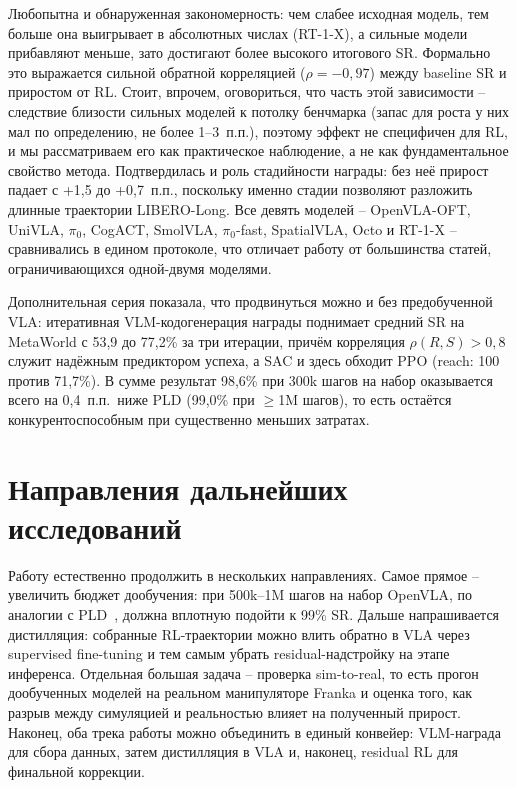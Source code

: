     Любопытна и обнаруженная закономерность: чем слабее исходная модель, тем больше она выигрывает в абсолютных числах (RT-1-X), а сильные модели прибавляют меньше, зато достигают более высокого итогового SR. Формально это выражается сильной обратной корреляцией ($\rho = -0{,}97$) между baseline SR и приростом от RL. Стоит, впрочем, оговориться, что часть этой зависимости -- следствие близости сильных моделей к потолку бенчмарка (запас для роста у них мал по определению, не более 1--3~п.п.), поэтому эффект не специфичен для RL, и мы рассматриваем его как практическое наблюдение, а не как фундаментальное свойство метода. Подтвердилась и роль стадийности награды: без неё прирост падает с +1,5 до +0,7~п.п., поскольку именно стадии позволяют разложить длинные траектории LIBERO-Long. Все девять моделей -- OpenVLA-OFT, UniVLA, $\pi_0$, CogACT, SmolVLA, $\pi_0$-fast, SpatialVLA, Octo и RT-1-X -- сравнивались в едином протоколе, что отличает работу от большинства статей, ограничивающихся одной-двумя моделями.

    Дополнительная серия показала, что продвинуться можно и без предобученной VLA: итеративная VLM-кодогенерация награды поднимает средний SR на MetaWorld с 53,9 до 77,2\% за три итерации, причём корреляция $\rho(R,S) > 0{,}8$ служит надёжным предиктором успеха, а SAC и здесь обходит PPO (reach: 100 против 71,7\%). В сумме результат 98,6\% при 300k шагов на набор оказывается всего на 0,4~п.п.\ ниже PLD (99,0\% при $\geq$1M шагов), то есть остаётся конкурентоспособным при существенно меньших затратах.


\section*{Направления дальнейших исследований}

    Работу естественно продолжить в нескольких направлениях. Самое прямое -- увеличить бюджет дообучения: при 500k--1M шагов на набор OpenVLA, по аналогии с PLD~\cite{pld2026}, должна вплотную подойти к 99\% SR. Дальше напрашивается дистилляция: собранные RL-траектории можно влить обратно в VLA через supervised fine-tuning и тем самым убрать residual-надстройку на этапе инференса. Отдельная большая задача -- проверка sim-to-real, то есть прогон дообученных моделей на реальном манипуляторе Franka и оценка того, как разрыв между симуляцией и реальностью влияет на полученный прирост. Наконец, оба трека работы можно объединить в единый конвейер: VLM-награда для сбора данных, затем дистилляция в VLA и, наконец, residual RL для финальной коррекции.

